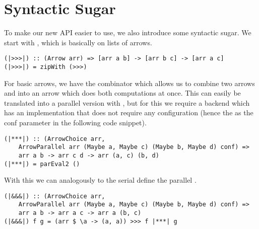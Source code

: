 \section{Syntactic Sugar}
To make our new API easier to use, we also introduce some syntactic sugar.
We start with \code{|>>>|}, which is basically \code{>>>} on lists of arrows.
\begin{lstlisting}[frame=htrbl]
(|>>>|) :: (Arrow arr) => [arr a b] -> [arr b c] -> [arr a c]
(|>>>|) = zipWith (>>>)
\end{lstlisting}
For basic arrows, we have the \code{***} combinator which allows us to combine two arrows  and  into an arrow  which does both computations at once. This can easily be translated into a parallel version with , but for this we require a backend which has an implementation that does not require any configuration (hence the \code{()} as the conf parameter in the following code snippet).
\begin{lstlisting}[frame=htrbl]
(|***|) :: (ArrowChoice arr,
	ArrowParallel arr (Maybe a, Maybe c) (Maybe b, Maybe d) conf) =>
	arr a b -> arr c d -> arr (a, c) (b, d)
(|***|) = parEval2 ()
\end{lstlisting}
With this we can analogously to the serial \code{&&&} define the parallel \code{|&&&|}.
\begin{lstlisting}[frame=htrbl]
(|&&&|) :: (ArrowChoice arr,
	ArrowParallel arr (Maybe a, Maybe c) (Maybe b, Maybe d) conf) =>
	arr a b -> arr a c -> arr a (b, c)
(|&&&|) f g = (arr $ \a -> (a, a)) >>> f |***| g
\end{lstlisting}